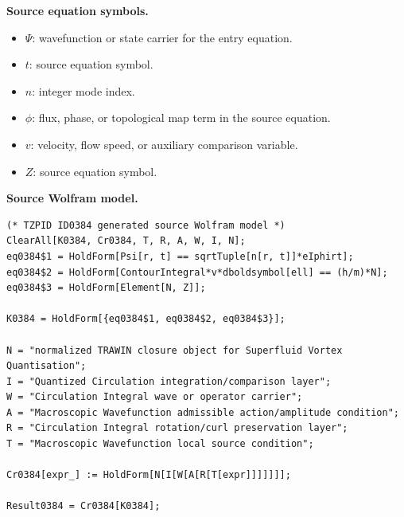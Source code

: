 \begin{minipage}[t]{0.49\linewidth}
\begingroup
\small
\raggedright
\textbf{Source equation symbols.}\par
\begin{itemize}[leftmargin=1.35em,itemsep=1pt,topsep=1pt,parsep=0pt]
    \item $\Psi$: wavefunction or state carrier for the entry equation.
    \item $t$: source equation symbol.
    \item $n$: integer mode index.
    \item $\phi$: flux, phase, or topological map term in the source equation.
    \item $v$: velocity, flow speed, or auxiliary comparison variable.
    \item $Z$: source equation symbol.
\end{itemize}
\endgroup
\end{minipage}\hfill
\begin{minipage}[t]{0.47\linewidth}
\begingroup
\scriptsize
\raggedright
\textbf{Source Wolfram model.}\par
\begin{Verbatim}[fontsize=\tiny,breaklines=true,breakanywhere=true]
(* TZPID ID0384 generated source Wolfram model *)
ClearAll[K0384, Cr0384, T, R, A, W, I, N];
eq0384$1 = HoldForm[Psi[r, t] == sqrtTuple[n[r, t]]*eIphirt];
eq0384$2 = HoldForm[ContourIntegral*v*dboldsymbol[ell] == (h/m)*N];
eq0384$3 = HoldForm[Element[N, Z]];

K0384 = HoldForm[{eq0384$1, eq0384$2, eq0384$3}];

N = "normalized TRAWIN closure object for Superfluid Vortex Quantisation";
I = "Quantized Circulation integration/comparison layer";
W = "Circulation Integral wave or operator carrier";
A = "Macroscopic Wavefunction admissible action/amplitude condition";
R = "Circulation Integral rotation/curl preservation layer";
T = "Macroscopic Wavefunction local source condition";

Cr0384[expr_] := HoldForm[N[I[W[A[R[T[expr]]]]]]];

Result0384 = Cr0384[K0384];
\end{Verbatim}
\endgroup
\end{minipage}

